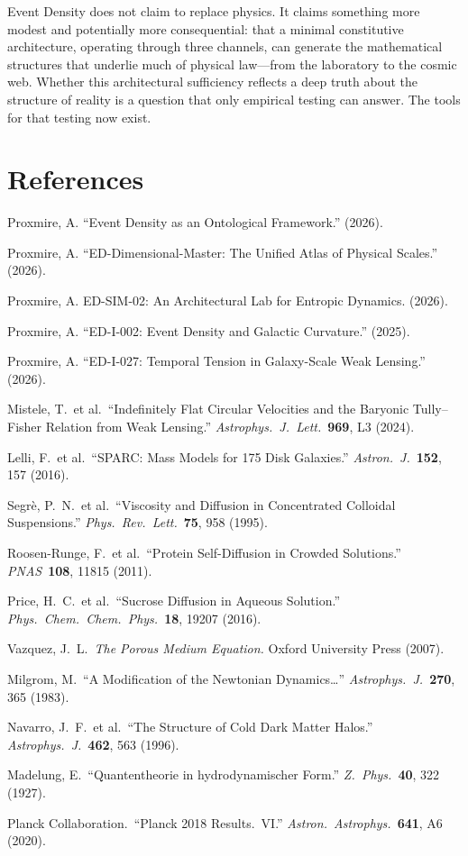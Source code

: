 \documentclass[12pt,letterpaper]{article}
\begin{document}
Event Density does not claim to replace physics. It claims something more modest and potentially more consequential: that a minimal constitutive architecture, operating through three channels, can generate the mathematical structures that underlie much of physical law---from the laboratory to the cosmic web. Whether this architectural sufficiency reflects a deep truth about the structure of reality is a question that only empirical testing can answer. The tools for that testing now exist.

\section*{References}

\begin{enumerate}[leftmargin=2em, label={[\arabic*]}]
\item Proxmire, A. ``Event Density as an Ontological Framework.'' (2026).
\item Proxmire, A. ``ED-Dimensional-Master: The Unified Atlas of Physical Scales.'' (2026).
\item Proxmire, A. ED-SIM-02: An Architectural Lab for Entropic Dynamics. (2026).
\item Proxmire, A. ``ED-I-002: Event Density and Galactic Curvature.'' (2025).
\item Proxmire, A. ``ED-I-027: Temporal Tension in Galaxy-Scale Weak Lensing.'' (2026).
\item Mistele, T.\ et al.\ ``Indefinitely Flat Circular Velocities and the Baryonic Tully--Fisher Relation from Weak Lensing.'' \textit{Astrophys.\ J.\ Lett.}\ \textbf{969}, L3 (2024).
\item Lelli, F.\ et al.\ ``SPARC: Mass Models for 175 Disk Galaxies.'' \textit{Astron.\ J.}\ \textbf{152}, 157 (2016).
\item Segr\`e, P.~N.\ et al.\ ``Viscosity and Diffusion in Concentrated Colloidal Suspensions.'' \textit{Phys.\ Rev.\ Lett.}\ \textbf{75}, 958 (1995).
\item Roosen-Runge, F.\ et al.\ ``Protein Self-Diffusion in Crowded Solutions.'' \textit{PNAS}\ \textbf{108}, 11815 (2011).
\item Price, H.~C.\ et al.\ ``Sucrose Diffusion in Aqueous Solution.'' \textit{Phys.\ Chem.\ Chem.\ Phys.}\ \textbf{18}, 19207 (2016).
\item Vazquez, J.~L.\ \textit{The Porous Medium Equation.} Oxford University Press (2007).
\item Milgrom, M.\ ``A Modification of the Newtonian Dynamics\ldots'' \textit{Astrophys.\ J.}\ \textbf{270}, 365 (1983).
\item Navarro, J.~F.\ et al.\ ``The Structure of Cold Dark Matter Halos.'' \textit{Astrophys.\ J.}\ \textbf{462}, 563 (1996).
\item Madelung, E.\ ``Quantentheorie in hydrodynamischer Form.'' \textit{Z.\ Phys.}\ \textbf{40}, 322 (1927).
\item Planck Collaboration.\ ``Planck 2018 Results.\ VI.'' \textit{Astron.\ Astrophys.}\ \textbf{641}, A6 (2020).
\end{enumerate}
\end{document}
